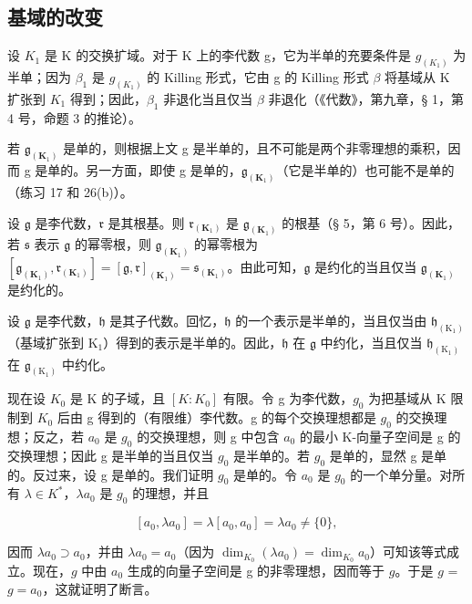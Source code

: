 \subsection{基域的改变}

设 \(K_{1}\) 是 K 的交换扩域。对于 K 上的李代数 g，它为半单的充要条件是 \(g_{(K_{1})}\) 为半单；因为 \(\beta_{1}\) 是 \(g_{(K_{1})}\) 的 Killing 形式，它由 g 的 Killing 形式 \(\beta\) 将基域从 K 扩张到 \(K_{1}\) 得到；因此，\(\beta_{1}\) 非退化当且仅当 \(\beta\) 非退化（《代数》，第九章，§ 1，第 4 号，命题 3 的推论）。

若 \(\mathfrak{g}_{(\mathbf{K}_{1})}\) 是单的，则根据上文 g 是半单的，且不可能是两个非零理想的乘积，因而 g 是单的。另一方面，即使 g 是单的，\(\mathfrak{g}_{(\mathbf{K}_{1})}\)（它是半单的）也可能不是单的（练习 17 和 26(b)）。

设 \(\mathfrak{g}\) 是李代数，\(\mathfrak{r}\) 是其根基。则 \(\mathfrak{r}_{(\mathbf{K}_1)}\) 是 \(\mathfrak{g}_{(\mathbf{K}_1)}\) 的根基（§ 5，第 6 号）。因此，若 \(\mathfrak{s}\) 表示 \(\mathfrak{g}\) 的幂零根，则 \(\mathfrak{g}_{(\mathbf{K}_1)}\) 的幂零根为 \([\mathfrak{g}_{(\mathbf{K}_1)},\mathfrak{r}_{(\mathbf{K}_1)}] = [\mathfrak{g},\mathfrak{r}]_{(\mathbf{K}_1)} = \mathfrak{s}_{(\mathbf{K}_1)}\)。由此可知，\(\mathfrak{g}\) 是约化的当且仅当 \(\mathfrak{g}_{(\mathbf{K}_1)}\) 是约化的。

设 \(\mathfrak{g}\) 是李代数，\(\mathfrak{h}\) 是其子代数。回忆，\(\mathfrak{h}\) 的一个表示是半单的，当且仅当由 \(\mathfrak{h}_{(\mathrm{K}_1)}\)（基域扩张到 \(\mathrm{K}_1\)）得到的表示是半单的。因此，\(\mathfrak{h}\) 在 \(\mathfrak{g}\) 中约化，当且仅当 \(\mathfrak{h}_{(\mathrm{K}_1)}\) 在 \(\mathfrak{g}_{(\mathrm{K}_1)}\) 中约化。

现在设 \(K_{0}\) 是 K 的子域，且 \([K:K_{0}]\) 有限。令 g 为李代数，\(g_{0}\) 为把基域从 K 限制到 \(K_{0}\) 后由 g 得到的（有限维）李代数。g 的每个交换理想都是 \(g_{0}\) 的交换理想；反之，若 \(a_{0}\) 是 \(g_{0}\) 的交换理想，则 g 中包含 \(a_{0}\) 的最小 K-向量子空间是 g 的交换理想；因此 g 是半单的当且仅当 \(g_{0}\) 是半单的。若 \(g_{0}\) 是单的，显然 g 是单的。反过来，设 g 是单的。我们证明 \(g_{0}\) 是单的。令 \(a_{0}\) 是 \(g_{0}\) 的一个单分量。对所有 \(\lambda \in K^{*}\)，\(\lambda a_{0}\) 是 \(g_{0}\) 的理想，并且

\[
\left[ a _ {0}, \lambda a _ {0} \right] = \lambda \left[ a _ {0}, a _ {0} \right] = \lambda a _ {0} \neq \{0 \},
\]

因而 \(\lambda a_0 \supset a_0\)，并由 \(\lambda a_0 = a_0\)（因为 \(\dim_{K_0}(\lambda a_0) = \dim_{K_0}a_0\)）可知该等式成立。现在，\(g\) 中由 \(a_0\) 生成的向量子空间是 g 的非零理想，因而等于 \(g\)。于是 \(g\) = \(g = a_0\)，这就证明了断言。

